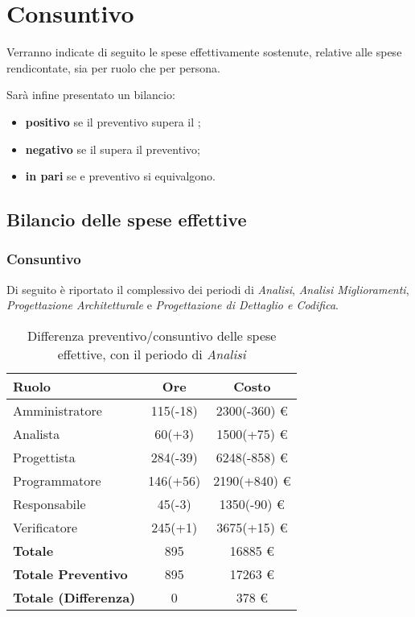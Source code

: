 \section{Consuntivo} 
Verranno indicate di seguito le spese effettivamente sostenute, relative alle spese rendicontate, sia per ruolo che per persona.

Sar\`a infine presentato un bilancio:
\begin{itemize}
\item \textbf{positivo} se il preventivo supera il ;
\item \textbf{negativo} se il  supera il preventivo;
\item \textbf{in pari} se  e preventivo si equivalgono.
\end{itemize}

\subsection{Bilancio delle spese effettive}
\subsubsection{Consuntivo}
Di seguito \`e riportato il  complessivo dei periodi di \textit{Analisi}, \textit{Analisi Miglioramenti}, \textit{Progettazione Architetturale} e \textit{Progettazione di Dettaglio e Codifica}.


\begin{table}[H]
	\centering
	\begin{tabular}{ l c c }
		\textbf{Ruolo} & \textbf{Ore} & \textbf{Costo} \\
		\hline
		Amministratore & 115(-18) & 2300(-360) \euro{} \\
		Analista & 60(+3) & 1500(+75) \euro{} \\
		Progettista & 284(-39) & 6248(-858) \euro{} \\
		Programmatore & 146(+56) & 2190(+840) \euro{} \\
		Responsabile & 45(-3) & 1350(-90) \euro{} \\
		Verificatore & 245(+1) & 3675(+15) \euro{} \\
		\hline
		\textbf{Totale \glossaryItem{Consuntivo}} & 895 & 16885 \euro{} \\
		\hline
		\textbf{Totale Preventivo} & 895 & 17263 \euro{} \\
		\hline
		\textbf{Totale (Differenza)} & 0 & 378 \euro{} \\
		\hline
	\end{tabular}
	\caption{Differenza preventivo/consuntivo delle spese effettive, con il periodo di \textit{Analisi}}
\end{table}


